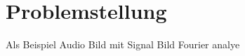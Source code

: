 %
%
%
%
\section{Problemstellung\label{sonogramm:section:teil0}}
Als 
Beispiel Audio
Bild mit Signal
Bild Fourier analye
